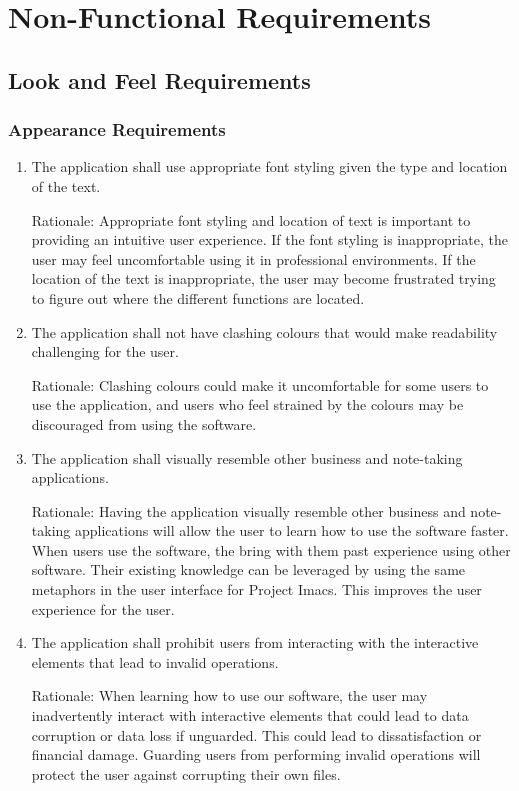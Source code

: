\documentclass{article}
\begin{document}
\newpage
\section{Non-Functional Requirements}
\subsection{Look and Feel Requirements}
\subsubsection{Appearance Requirements}
\begin{enumerate}[{A}PR1]
\item The application shall use appropriate font styling given the type and location of the text.

Rationale: Appropriate font styling and location of text is important to providing an intuitive user experience. If the font styling is inappropriate, the user may feel uncomfortable using it in professional environments. If the location of the text is inappropriate, the user may become frustrated trying to figure out where the different functions are located.
\item The application shall not have clashing colours that would make readability challenging for the user.

Rationale: Clashing colours could make it uncomfortable for some users to use the application, and users who feel strained by the colours may be discouraged from using the software.
\item The application shall visually resemble other business and note-taking applications.

Rationale: Having the application visually resemble other business and note-taking applications will allow the user to learn how to use the software faster. When users use the software, the bring with them past experience using other software. Their existing knowledge can be leveraged by using the same metaphors in the user interface for Project Imacs. This improves the user experience for the user.
\item The application shall prohibit users from interacting with the interactive elements that lead to invalid operations.

Rationale: When learning how to use our software, the user may inadvertently interact with interactive elements that could lead to data corruption or data loss if unguarded. This could lead to dissatisfaction or financial damage. Guarding users from performing invalid operations will protect the user against corrupting their own files.
\end{enumerate}
\end{document}
